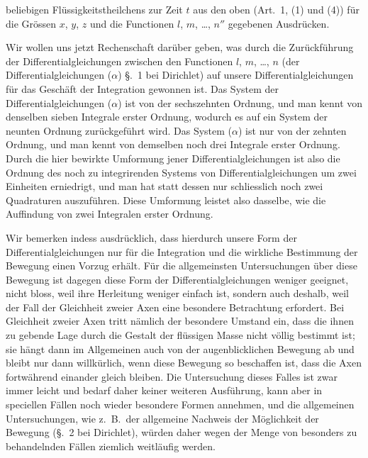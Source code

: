 \documentclass[12pt,a4paper]{book}
\theoremstyle{definition}
\theoremstyle{remark}
\begin{document}
beliebigen Fl\"ussigkeitstheilchens zur Zeit $t$ aus den oben (Art.~1, (1) und (4)) f\"ur die Gr\"ossen $x$, $y$, $z$ und die Functionen $l$, $m$, \dots, $n''$ gegebenen Ausdr\"ucken.

Wir wollen uns jetzt Rechenschaft dar\"uber geben, was durch die Zur\"uckf\"uhrung der Differentialgleichungen zwischen den Functionen $l$, $m$, \dots, $n$ (der Differentialgleichungen ($\alpha$) \S.~1 bei Dirichlet) auf unsere Differentialgleichungen f\"ur das Gesch\"aft der Integration gewonnen ist. Das System der Differentialgleichungen ($\alpha$) ist von der sechszehnten Ordnung, und man kennt von denselben sieben Integrale erster Ordnung, wodurch es auf ein System der neunten Ordnung zur\"uckgef\"uhrt wird. Das System ($\alpha$) ist nur von der zehnten Ordnung, und man kennt von demselben noch drei Integrale erster Ordnung. Durch die hier bewirkte Umformung jener Differentialgleichungen ist also die Ordnung des noch zu integrirenden Systems von Differentialgleichungen um zwei Einheiten erniedrigt, und man hat statt dessen nur schliesslich noch zwei Quadraturen auszuf\"uhren. Diese Umformung leistet also dasselbe, wie die Auffindung von zwei Integralen erster Ordnung.

Wir bemerken indess ausdr\"ucklich, dass hierdurch unsere Form der Differentialgleichungen nur f\"ur die Integration und die wirkliche Bestimmung der Bewegung einen Vorzug erh\"alt. F\"ur die allgemeinsten Untersuchungen \"uber diese Bewegung ist dagegen diese Form der Differentialgleichungen weniger geeignet, nicht bloss, weil ihre Herleitung weniger einfach ist, sondern auch deshalb, weil der Fall der Gleichheit zweier Axen eine besondere Betrachtung erfordert. Bei Gleichheit zweier Axen tritt n\"amlich der besondere Umstand ein, dass die ihnen zu gebende Lage durch die Gestalt der fl\"ussigen Masse nicht v\"ollig bestimmt ist; sie h\"angt dann im Allgemeinen auch von der augenblicklichen Bewegung ab und bleibt nur dann willk\"urlich, wenn diese Bewegung so beschaffen ist, dass die Axen fortw\"ahrend einander gleich bleiben. Die Untersuchung dieses Falles ist zwar immer leicht und bedarf daher keiner weiteren Ausf\"uhrung, kann aber in speciellen F\"allen noch wieder besondere Formen annehmen, und die allgemeinen Untersuchungen, wie z.~B.~der allgemeine Nachweis der M\"oglichkeit der Bewegung (\S.~2 bei Dirichlet), w\"urden daher wegen der Menge von besonders zu behandelnden F\"allen ziemlich weitl\"aufig werden.
\end{document}
